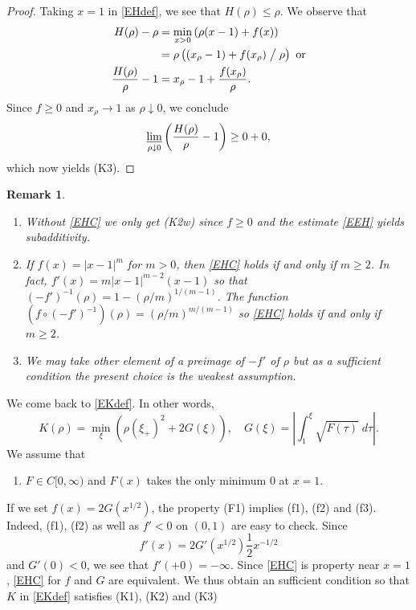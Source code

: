 \documentclass[11pt]{amsart} %
\numberwithin{equation}{section}
\newtheorem{remark}[thm]{Remark}
\begin{document}
%
\begin{proof}
Taking $x=1$ in \eqref{EHdef}, we see that $H(\rho)\leq\rho$.
 We observe that
\begin{align*}
	H(\rho) - \rho &= \min_{x>0} \left( \rho(x-1) + f(x) \right) \\
	&= \rho \left( (x_\rho-1) + f(x_\rho)\bigm/\rho \right)\ \text{or} \\
	\frac{H(\rho)}{\rho} -1 &= x_\rho -1 + \frac{f(x_\rho)}{\rho}. 
\end{align*}
Since $f\geq0$ and $x_\rho\to1$ as $\rho\downarrow0$, we conclude
\[
	\varliminf_{\rho\downarrow0} \left( \frac{H(\rho)}{\rho} -1 \right) \geq 0+0,
\]
which now yields (K3).
\end{proof}
\begin{remark} \label{RKCon}
\begin{enumerate}
\item[(i)] Without \eqref{EHC} we only get (K2w) since $f\geq0$ and the estimate \eqref{EEH} yields subadditivity.
\item[(i\hspace{-1pt}i)] If $f(x)=|x-1|^m$ for $m>0$, then \eqref{EHC} holds if and only if $m\geq2$.
 In fact, $f'(x)=m|x-1|^{m-2}(x-1)$ so that $(-f')^{-1}(\rho)=1-(\rho/m)^{1/(m-1)}$.
 The function $\left(f\circ(-f')^{-1}\right)(\rho)=(\rho/m)^{m/(m-1)}$ so \eqref{EHC} holds if and only if $m\geq2$.
\item[(i\hspace{-1pt}i\hspace{-1pt}i)] We may take other element of a preimage of $-f'$ of $\rho$ but as a sufficient condition the present choice is the weakest assumption.
\end{enumerate}
\end{remark}
We come back to \eqref{EKdef}.
 In other words,
\[
	K(\rho) = \min_\xi \left(\rho(\xi_+)^2 + 2G(\xi)\right), \quad
	G(\xi) = \left| \int_1^\xi \sqrt{F(\tau)}\; d\tau \right|.
\]
We assume that
\begin{enumerate}
\item[(F1)] $F\in C[0,\infty)$ and $F(x)$ takes the only minimum $0$ at $x=1$.
\end{enumerate}
If we set $f(x)=2G(x^{1/2})$, the property (F1) implies (f1), (f2) and (f3).
 Indeed, (f1), (f2) as well as $f'<0$ on $(0,1)$ are easy to check.
 Since 
\[
	f'(x) = 2G'(x^{1/2}) \frac12 x^{-1/2}
\]
and $G'(0)<0$, we see that $f'(+0)=-\infty$.
 Since \eqref{EHC} is property near $x=1$, \eqref{EHC} for $f$ and $G$ are equivalent.
 We thus obtain an sufficient condition so that $K$ in \eqref{EKdef} satisfies (K1), (K2) and (K3)
\end{document}
